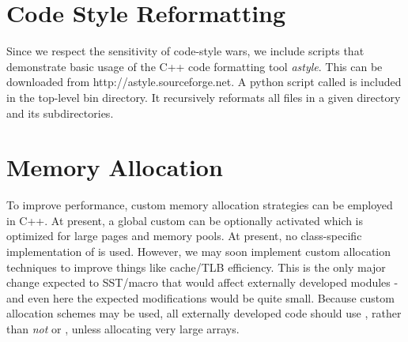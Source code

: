 \section{Code Style Reformatting}\label{sec:styleReformat}
Since we respect the sensitivity of code-style wars, we include scripts that demonstrate basic usage of the C++ code formatting tool \emph{astyle}.
This can be downloaded from {http://astyle.sourceforge.net}. 
A python script called  is included in the top-level bin directory.
It recursively reformats all files in a given directory and its subdirectories.

\section{Memory Allocation}\label{sec:memalloc}
To improve performance, custom memory allocation strategies can be employed in C++.
At present, a global custom  can be optionally activated which is optimized for large pages and memory pools.
At present, no class-specific implementation of  is used.
However, we may soon implement custom allocation techniques to improve things like cache/TLB efficiency.
This is the only major change expected to SST/macro that would affect externally developed modules - and even here the expected modifications would be quite small.
Because custom allocation schemes may be used, all externally developed code should use , rather than \emph{not}   or , unless allocating very large arrays.

